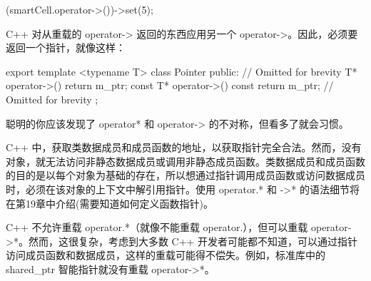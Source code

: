 \begin{cpp}
(smartCell.operator->())->set(5);
\end{cpp}

C++ 对从重载的 operator-> 返回的东西应用另一个 operator->。因此，必须要返回一个指针，就像这样：

\begin{cpp}
export template <typename T> class Pointer
{
    public:
        // Omitted for brevity
        T* operator->() { return m_ptr; }
        const T* operator->() const { return m_ptr; }
        // Omitted for brevity
};
\end{cpp}

聪明的你应该发现了 operator* 和 operator-> 的不对称，但看多了就会习惯。


C++ 中，获取类数据成员和成员函数的地址，以获取指针完全合法。然而，没有对象，就无法访问非静态数据成员或调用非静态成员函数。类数据成员和成员函数的目的是以每个对象为基础的存在，所以想通过指针调用成员函数或访问数据成员时，必须在该对象的上下文中解引用指针。使用 operator.* 和 ->* 的语法细节将在第19章中介绍(需要知道如何定义函数指针)。

C++ 不允许重载 operator.*（就像不能重载 operator.），但可以重载 operator->*。然而，这很复杂，考虑到大多数 C++ 开发者可能都不知道，可以通过指针访问成员函数和数据成员，这样的重载可能得不偿失。例如，标准库中的 shared\_ptr 智能指针就没有重载 operator->*。





















